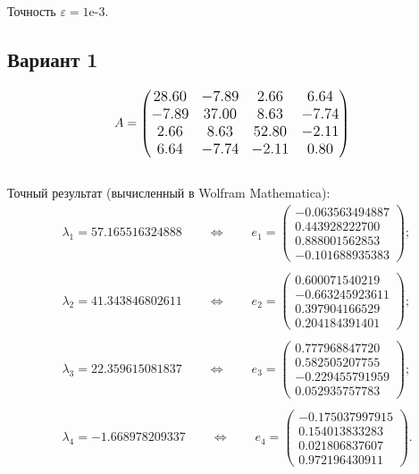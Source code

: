 \documentclass[12pt, a4paper]{article}
\begin{document}
	\begin{center}
	\large{Точность $\varepsilon = \textrm{1e-3}$.}
	\end{center}

	
	\subsection{Вариант 1}
	\[
	\large A = \begin{pmatrix}
		28.60 & -7.89 & 2.66 & 6.64 \\
		-7.89 & 37.00 & 8.63 & -7.74 \\
		2.66 & 8.63 & 52.80 & -2.11 \\
		6.64 & -7.74 & -2.11 & 0.80
	\end{pmatrix}
	\]
	\\
	Точный результат (вычисленный в Wolfram Mathematica):
	\begin{eqnarray*}
		& \lambda_1 = 57.165516324888 \qquad \Longleftrightarrow \qquad e_1 = \begin{pmatrix}
			-0.063563494887\\ 0.443928222700\\ 0.888001562853\\-0.101688935383
		\end{pmatrix};\\\\
		& \lambda_2 = 41.343846802611 \qquad \Longleftrightarrow \qquad e_2 = \begin{pmatrix}
			0.600071540219\\-0.663245923611\\ 0.397904166529\\ 0.204184391401
		\end{pmatrix};\\\\
		& \lambda_3 = 22.359615081837 \qquad \Longleftrightarrow \qquad e_3 = \begin{pmatrix}
			0.777968847720\\ 0.582505207755\\-0.229455791959\\ 0.052935757783
		\end{pmatrix};\\\\
		& \lambda_4 = -1.668978209337 \qquad \Longleftrightarrow \qquad e_4 = \begin{pmatrix}
			-0.175037997915\\ 0.154013833283\\ 0.021806837607\\ 0.972196430911
		\end{pmatrix}.
	\end{eqnarray*}
	\newpage
	
\end{document}
